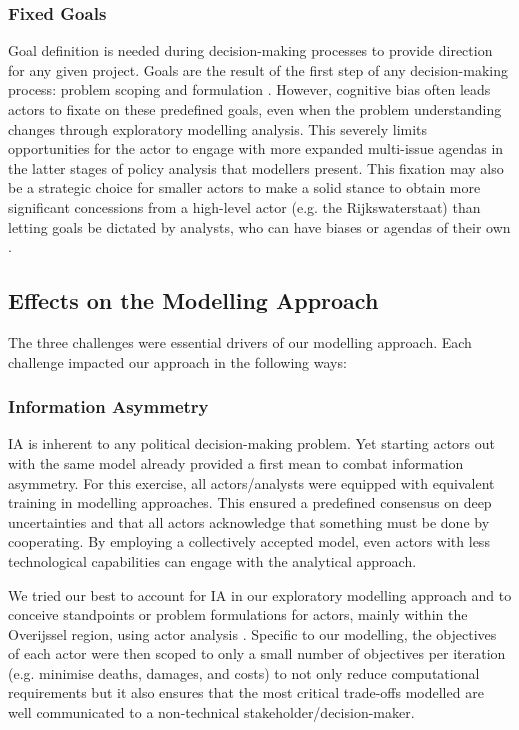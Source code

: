 \subsubsection{Fixed Goals}
Goal definition is needed during decision-making processes to provide direction for any given project. Goals are the result of the first step of any decision-making process: problem scoping and formulation \parencite{enserink_policy_2010}. However, cognitive bias often leads actors to fixate on these predefined goals, even when the problem understanding changes through exploratory modelling analysis. This severely limits opportunities for the actor to engage with more expanded multi-issue agendas in the latter stages of policy analysis that modellers present. This fixation may also be a strategic choice for smaller actors to make a solid stance to obtain more significant concessions from a high-level actor (e.g. the Rijkswaterstaat) than letting goals be dictated by analysts, who can have biases or agendas of their own \parencite{hans_de_bruijn_mark_de_bruijne_ernst_ten_heuvelhof_politics_2015}. 

\subsection{Effects on the Modelling Approach}

The three challenges were essential drivers of our modelling approach. Each challenge impacted our approach in the following ways: 

\subsubsection{Information Asymmetry} IA is inherent to any political decision-making problem. Yet starting actors out with the same model already provided a first mean to combat information asymmetry. For this exercise, all actors/analysts were equipped with equivalent training in modelling approaches. This ensured a predefined consensus on deep uncertainties and that all actors acknowledge that something must be done by cooperating. By employing a collectively accepted model, even actors with less technological capabilities can engage with the analytical approach.

We tried our best to account for IA in our exploratory modelling approach and to conceive standpoints or problem formulations for actors, mainly within the Overijssel region, using actor analysis \parencite{enserink_policy_2010}. Specific to our modelling, the objectives of each actor were then scoped to only a small number of objectives per iteration (e.g. minimise deaths, damages, and costs) to not only reduce computational requirements but it also ensures that the most critical trade-offs modelled are well communicated to a non-technical stakeholder/decision-maker. 

